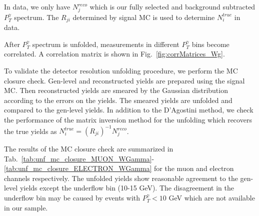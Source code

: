 In data, we only have $N^{reco}_j$ which is our fully selected and background subtracted $P_T^{\gamma}$ spectrum. The $R_{ji}$ determined by signal MC is used to determine $N^{true}_i$ in data.

After $P_T^{\gamma}$ spectrum is unfolded, measurements in different $P_T^{\gamma}$ bins become correlated. A correlation matrix is shown in Fig.~\ref{fig:corrMatrices_Wg}.

To validate the detector resolution unfolding procedure, we perform the MC closure check. Gen-level and reconstructed yields are prepared using the signal MC. Then reconstructed yields are smeared by the Gaussian distribution according to the errors on the yields. The smeared yields are unfolded and compared to the gen-level yields. In addition to the D'Agostini method, we check the performance of the matrix inversion method for the unfolding which recovers the true yields as $N^{true}_i = (R_{ji})^{-1} N^{reco}_j$. 

The results of the MC closure check are summarized in Tab.~\ref{tab:unf_mc_closure_MUON_WGamma}-\ref{tab:unf_mc_closure_ELECTRON_WGamma} for the muon and electron channels respectively. The unfolded yields show reasonable agreement to the gen-level yields except the underflow bin (10-15 GeV). The disagreement in the underflow bin may be caused by events with $P_T^{\gamma}<10$ GeV which are not available in our sample. 


